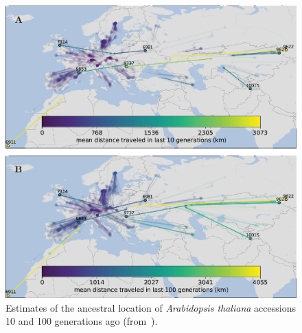 \begin{figure}
  \begin{center}
    \includegraphics[width=14cm]{arabidopsis-dispersal.eps}
  \end{center}
  \caption{Estimates of the ancestral location of {\it Arabidopsis
      thaliana\/} accessions 10 and 100 generations ago
    (from~\cite{Osmond-Coop-2021}).}\label{fig:arabidopsis-dispersal}
\end{figure}

